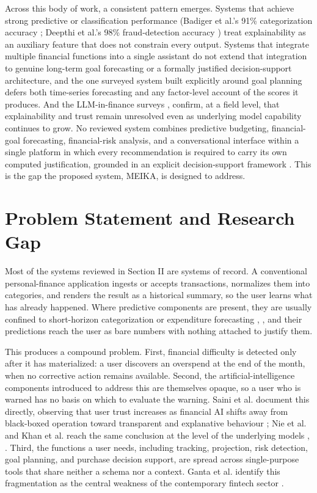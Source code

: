 \documentclass[conference]{IEEEtran}
\begin{document}
Across this body of work, a consistent pattern emerges. Systems that achieve strong predictive or classification performance (Badiger et al.'s 91\% categorization accuracy \cite{badiger2026spendai}; Deepthi et al.'s 98\% fraud-detection accuracy \cite{deepthi2026aipowered}) treat explainability as an auxiliary feature that does not constrain every output. Systems that integrate multiple financial functions into a single assistant \cite{ganta2025multimodule} do not extend that integration to genuine long-term goal forecasting or a formally justified decision-support architecture, and the one surveyed system built explicitly around goal planning \cite{patil2026nexus} defers both time-series forecasting and any factor-level account of the scores it produces. And the LLM-in-finance surveys \cite{nie2024survey}, \cite{khan2025bridging} confirm, at a field level, that explainability and trust remain unresolved even as underlying model capability continues to grow. No reviewed system combines predictive budgeting, financial-goal forecasting, financial-risk analysis, and a conversational interface within a single platform in which every recommendation is required to carry its own computed justification, grounded in an explicit decision-support framework \cite{pathak2010survey}. This is the gap the proposed system, MEIKA, is designed to address.


\section{Problem Statement and Research Gap}

Most of the systems reviewed in Section II are systems of record. A conventional personal-finance application ingests or accepts transactions, normalizes them into categories, and renders the result as a historical summary, so the user learns what has already happened. Where predictive components are present, they are usually confined to short-horizon categorization or expenditure forecasting \cite{kakulapati2026expensetracker}, \cite{badiger2026spendai}, and their predictions reach the user as bare numbers with nothing attached to justify them.

This produces a compound problem. First, financial difficulty is detected only after it has materialized: a user discovers an overspend at the end of the month, when no corrective action remains available. Second, the artificial-intelligence components introduced to address this are themselves opaque, so a user who is warned has no basis on which to evaluate the warning. Saini et al. document this directly, observing that user trust increases as financial AI shifts away from black-boxed operation toward transparent and explanative behaviour \cite{saini2025aipowered}; Nie et al. and Khan et al. reach the same conclusion at the level of the underlying models \cite{nie2024survey}, \cite{khan2025bridging}. Third, the functions a user needs, including tracking, projection, risk detection, goal planning, and purchase decision support, are spread across single-purpose tools that share neither a schema nor a context. Ganta et al. identify this fragmentation as the central weakness of the contemporary fintech sector \cite{ganta2025multimodule}.
\end{document}

